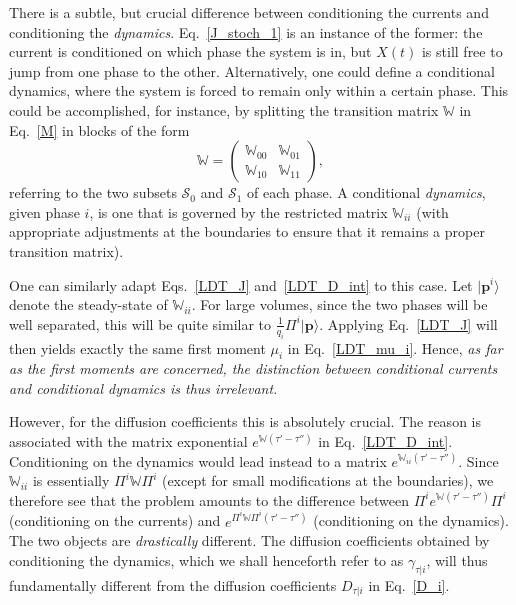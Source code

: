 \documentclass[aps,pre,reprint, amsmath, amssymb,superscriptaddress]{revtex4-1}
\begin{document}
There is a subtle, but crucial difference between conditioning the currents and conditioning the \emph{dynamics}. 
Eq.~\eqref{J_stoch_1} is an instance of the former: the current is conditioned on which phase the system is in, but $X(t)$ is still free to jump from one phase to the other. 
Alternatively, one could  define a conditional dynamics, where the system is forced to remain only within a certain phase.
This could be accomplished, for instance, by splitting the transition matrix $\mathbb{W}$ in Eq.~\eqref{M} in blocks of the form 
\begin{equation}
    \mathbb{W} = \begin{pmatrix}
    \mathbb{W}_{00} & \mathbb{W}_{01} \\[0.2cm]
    \mathbb{W}_{10} & \mathbb{W}_{11}
    \end{pmatrix},
\end{equation}
referring to the two subsets $\mathcal{S}_0$ and $\mathcal{S}_1$ of each phase. 
A conditional \emph{dynamics}, given phase $i$, is one that is governed by the restricted matrix $\mathbb{W}_{ii}$ (with  appropriate adjustments at the boundaries to ensure that it remains a proper transition matrix). 

One can similarly adapt Eqs.~\eqref{LDT_J} and~\eqref{LDT_D_int} to  this case. 
Let $|\bm{p}^i\rangle$ denote the steady-state of $\mathbb{W}_{ii}$.
For large volumes, since the two phases will be well separated, this will be quite similar to $\frac{1}{q_i}\Pi^i |\bm{p}\rangle$.
Applying Eq.~\eqref{LDT_J} will then yields exactly the same first moment $\mu_i$  in Eq.~\eqref{LDT_mu_i}. 
Hence, \emph{as far as the first moments are concerned, the distinction between conditional currents and conditional dynamics is thus irrelevant.}

However, for the diffusion coefficients this is absolutely crucial.
The reason is associated with the matrix exponential $e^{\mathbb{W}(\tau'-\tau'')}$ in Eq.~\eqref{LDT_D_int}.
Conditioning on the dynamics would lead instead to a matrix
$e^{\mathbb{W}_{ii}(\tau'-\tau'')}$. 
Since $\mathbb{W}_{ii}$ is essentially $\Pi^i \mathbb{W} \Pi^i$ (except for small modifications at the boundaries), we therefore see that the problem amounts to the difference between  $\Pi^i e^{\mathbb{W}(\tau'-\tau'')} \Pi^i$ (conditioning on the currents) and  $e^{\Pi^i \mathbb{W} \Pi^i(\tau'-\tau'')}$ (conditioning on the dynamics).
The two objects are \emph{drastically} different. 
The diffusion coefficients obtained by conditioning the dynamics, which we shall henceforth refer to as $\gamma_{\tau|i}$, will thus fundamentally different from the diffusion coefficients $D_{\tau|i}$ in Eq.~\eqref{D_i}.
\end{document}
